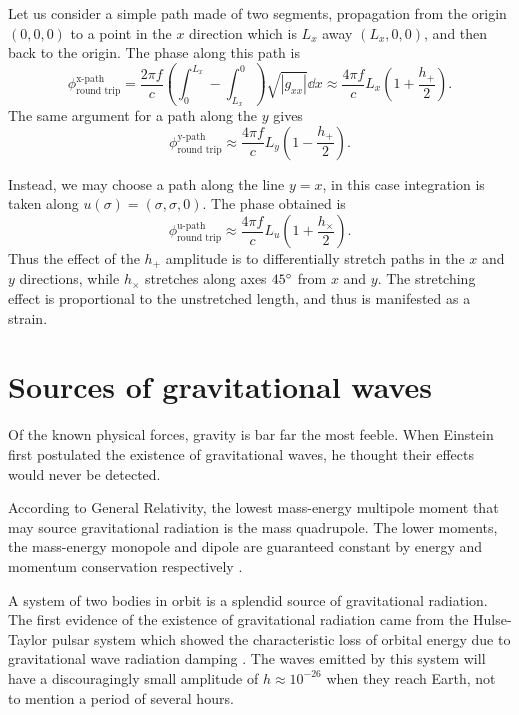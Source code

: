 Let us consider a simple path made of two segments, propagation from the origin $(0,0,0)$ to a point in the $x$ direction which is $L_x$ away $(L_x,0,0)$, and then back to the origin. %
The phase along this path is
\begin{equation}
\phi_{\text{round trip}}^{\text{x-path}}= \frac{2\pi f}{c} \left(\int_0^{L_x}-\int^0_{L_x}\right)\sqrt{|g_{xx}|}\dd x \approx \frac{4\pi f}{c} L_x \left(1+\frac{h_+}{2}\right).
\end{equation} 
The same argument for a path along the $y$ gives
\begin{equation}
\phi_{\text{round trip}}^{\text{y-path}} \approx \frac{4\pi f}{c} L_y \left(1-\frac{h_+}{2}\right).
\end{equation} 

Instead, we may choose a path along the line $y=x$, in this case integration is taken along $ u(\sigma) = (\sigma,\sigma,0)$. %
The phase obtained is
\begin{equation}
\phi_{\text{round trip}}^{\text{u-path}} \approx \frac{4\pi f}{c} L_u \left(1+\frac{h_\times}{2}\right).
\end{equation} 
Thus the effect of the $h_+$ amplitude is to differentially stretch paths in the $x$ and $y$ directions, while $h_\times$ stretches along axes $45 ^\circ$ from $x$ and $y$. %
 The stretching effect is proportional to the unstretched length, and thus is manifested as a strain.
\section{Sources of gravitational waves}
Of the known physical forces, gravity is bar far the most feeble. %
When Einstein first postulated the existence of gravitational waves, he thought their effects would never be detected.

According to General Relativity, the lowest mass-energy multipole moment that may source gravitational radiation is the mass quadrupole. %
The lower moments, the mass-energy monopole and dipole are guaranteed constant by energy and momentum conservation respectively \cite[Section 7.5]{carroll2004spacetime}.

A system of two bodies in orbit is a splendid source of gravitational radiation. %
The first evidence of the existence of gravitational radiation came from the Hulse-Taylor pulsar system which showed the characteristic loss of orbital energy due to gravitational wave radiation damping \cite{Taylor1979}. %
The waves emitted by this system will have a discouragingly small amplitude of $h\approx 10^{-26}$ when they reach Earth, not to mention a period of several hours. %


